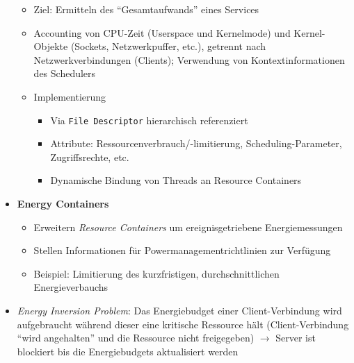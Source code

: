 \begin{itemize}
	\begin{itemize}
		\item Ziel: Ermitteln des "`Gesamtaufwands"' eines Services
		\item Accounting von CPU-Zeit (Userspace und Kernelmode) und Kernel-Objekte (Sockets, Netzwerkpuffer, etc.), getrennt nach Netzwerkverbindungen (Clients); Verwendung von Kontextinformationen des Schedulers
		\item Implementierung
		\begin{itemize}
			\item Via \texttt{File Descriptor} hierarchisch referenziert
			\item Attribute: Ressourcenverbrauch/-limitierung, Scheduling-Parameter, Zugriffsrechte, etc.
			\item Dynamische Bindung von Threads an Resource Containers
		\end{itemize}
	\end{itemize}
	\item \textbf{Energy Containers}
	\begin{itemize}
		\item Erweitern \textit{Resource Containers} um ereignisgetriebene Energiemessungen
		\item Stellen Informationen für Powermanagementrichtlinien zur Verfügung
		\item Beispiel: Limitierung des kurzfristigen, durchschnittlichen Energieverbauchs
	\end{itemize}
	\item \textit{Energy Inversion Problem}: Das Energiebudget einer Client-Verbindung wird aufgebraucht während dieser eine kritische Ressource hält (Client-Verbindung "`wird angehalten"' und die Ressource nicht freigegeben) \(\rightarrow\) Server ist blockiert bis die Energiebudgets aktualisiert werden
\end{itemize}


